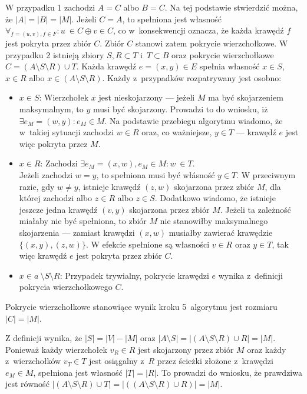 \begin{bproof}
  W przypadku 1 zachodzi $A = C$ albo $B = C$.
  Na tej podstawie stwierdzić można, że ${|A|=|B|=|M|}$.
  Jeżeli $C = A$, to spełniona jest własność $\forall_{f=(u,v), f\in F}: u~\in C \oplus v \in C$, co
  w~konsekwencji oznacza, że każda krawędź $f$ jest pokryta przez zbiór $C$.
  Zbiór $C$ stanowi zatem pokrycie wierzchołkowe.
  W przypadku 2 istnieją zbiory $S, R \subset T$ i~$T \subset B$ oraz pokrycie wierzchołkowe $C=(A \setminus S \setminus R) \cup T$.
  Każda krawędź $e=(x, y) \in E$ spełnia własność $x \in S$, $x \in R$ albo $x \in (A \setminus S \setminus R)$.
  Każdy z~przypadków rozpatrywany jest osobno:
  \begin{itemize}
    \item \underline{$x \in S$}: Wierzchołek $x$ jest nieskojarzony --- jeżeli $M$ ma być skojarzeniem maksymalnym, to $y$ musi być skojarzony.
      Prowadzi to do wniosku, iż $\exists{e_M=(w,y)}: e_M \in M$.
      Na podstawie przebiegu algorytmu wiadomo, że w~takiej sytuacji zachodzi $w \in R$
      oraz, co ważniejsze, $y \in T$ --- krawędź $e$ jest więc pokryta przez $M$.
    \item \underline{$x \in R$}: Zachodzi $\exists{e_M=(x,w), e_M\in M}: w~\in T$. \\
      Jeżeli zachodzi $w=y$, to spełniona musi być włásność $y \in T$.
      W przeciwnym razie, gdy $w \neq y$, istnieje krawędź $(z,w)$ skojarzona przez zbiór $M$, dla której zachodzi albo $z \in R$ albo $z \in S$.
      Dodatkowo wiadomo, że istnieje jeszcze jedna krawędź $(v, y)$ skojarzona przez zbiór $M$.
      Jeżeli ta zależność miałaby nie być spełniona, to zbiór $M$ nie stanowiłby maksymalnego skojarzenia --- zamiast krawędzi $(x,w)$ musiałby zawierać krawędzie $\{(x,y),(z,w)\}$.
      W efekcie spełnione są własności $v \in R$ oraz $y \in T$, tak więc krawędź $e$ jest pokryta przez zbiór $C$.
    \item \underline{$x \in a~\setminus S \setminus R$}: Przypadek trywialny,
      pokrycie krawędzi $e$ wynika z~definicji pokrycia wierzchołkowego $C$.
  \end{itemize}
\end{bproof}
\begin{theorem}
  Pokrycie wierzchołkowe stanowiące wynik kroku 5\ algorytmu jest rozmiaru $|C| = |M|$. 
\end{theorem}
\begin{bproof}
  Z definicji wynika, że $|S| = |V| - |M|$ oraz $|A \setminus S|=|(A \setminus S
  \setminus R) \cup R|=|M|$.\\
  Ponieważ każdy wierzchołek $v_R \in R$ jest skojarzony przez zbiór $M$ oraz każdy z~wierzchołków $v_T \in T$ jest osiągalny z~$R$ przez ścieżki złożone z~krawędzi $e_M \in M$, spełniona jest własność $|T|=|R|$.
  To prowadzi do wniosku, że prawdziwa jest równość $|(A\setminus S\setminus R)\cup T|=|((A \setminus S \setminus R) \cup R)|=|M|$.
\end{bproof}
